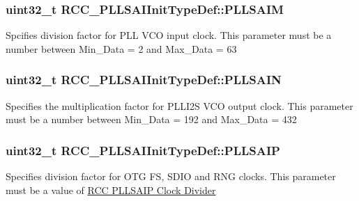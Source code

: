 \subsubsection[{\texorpdfstring{P\+L\+L\+S\+A\+IM}{PLLSAIM}}]{\setlength{\rightskip}{0pt plus 5cm}uint32\+\_\+t R\+C\+C\+\_\+\+P\+L\+L\+S\+A\+I\+Init\+Type\+Def\+::\+P\+L\+L\+S\+A\+IM}\hypertarget{struct_r_c_c___p_l_l_s_a_i_init_type_def_a8cf099e8f1fcd2aae663b7dec31af622}{}\label{struct_r_c_c___p_l_l_s_a_i_init_type_def_a8cf099e8f1fcd2aae663b7dec31af622}
Spcifies division factor for P\+LL V\+CO input clock. This parameter must be a number between Min\+\_\+\+Data = 2 and Max\+\_\+\+Data = 63 
\subsubsection[{\texorpdfstring{P\+L\+L\+S\+A\+IN}{PLLSAIN}}]{\setlength{\rightskip}{0pt plus 5cm}uint32\+\_\+t R\+C\+C\+\_\+\+P\+L\+L\+S\+A\+I\+Init\+Type\+Def\+::\+P\+L\+L\+S\+A\+IN}\hypertarget{struct_r_c_c___p_l_l_s_a_i_init_type_def_a7ec92e831b8ca06243fce02f46b76807}{}\label{struct_r_c_c___p_l_l_s_a_i_init_type_def_a7ec92e831b8ca06243fce02f46b76807}
Specifies the multiplication factor for P\+L\+L\+I2S V\+CO output clock. This parameter must be a number between Min\+\_\+\+Data = 192 and Max\+\_\+\+Data = 432 
\subsubsection[{\texorpdfstring{P\+L\+L\+S\+A\+IP}{PLLSAIP}}]{\setlength{\rightskip}{0pt plus 5cm}uint32\+\_\+t R\+C\+C\+\_\+\+P\+L\+L\+S\+A\+I\+Init\+Type\+Def\+::\+P\+L\+L\+S\+A\+IP}\hypertarget{struct_r_c_c___p_l_l_s_a_i_init_type_def_a8cfa7d387fc9b118e9066a63d2b845bf}{}\label{struct_r_c_c___p_l_l_s_a_i_init_type_def_a8cfa7d387fc9b118e9066a63d2b845bf}
Specifies division factor for O\+TG FS, S\+D\+IO and R\+NG clocks. This parameter must be a value of \hyperlink{group___r_c_c_ex___p_l_l_s_a_i_p___clock___divider}{R\+CC P\+L\+L\+S\+A\+IP Clock Divider} 
